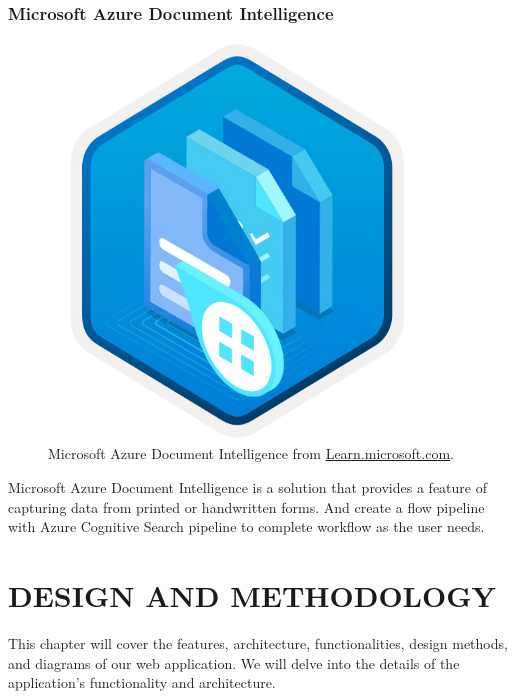 \documentclass[12pt,oneside,openright,a4paper]{cpe-english-project}
\begin{document}
\subsection{Microsoft Azure Document Intelligence}
\begin{figure}[H]
\centering
\includegraphics[width=10cm]{./assets/Microsoft-Azure.jpg}
\caption{Microsoft Azure Document Intelligence from 
\href{https://learn.microsoft.com/th-th/training/achievements/extract-data-from-forms-use-form-recognizer.svg}{Learn.microsoft.com}.}
\label{fig:microsoft-azure-doc}  
\end{figure}

	Microsoft Azure Document Intelligence is a solution that provides a feature of capturing data from printed or handwritten forms. And create a flow pipeline with Azure Cognitive Search pipeline to complete workflow as the user needs.
	
\chapter{DESIGN AND METHODOLOGY}

This chapter will cover the features, architecture, functionalities, design methods, and
diagrams of our web application. We will delve into the details of the application’s
functionality and architecture.
\end{document}
